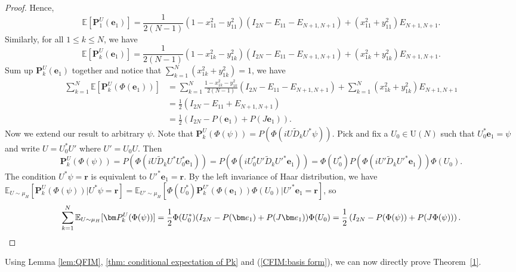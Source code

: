 \documentclass{amsart}
\theoremstyle{plain}
\theoremstyle{definition}
\theoremstyle{remark}
\newcommand{\thmref}[1]{Theorem~\ref{#1}}
\newcommand{\EE}{\mathbb{E}}
\begin{document}
\begin{proof}
    Hence, 
    \[\EE[\bm P_1^U(\bm e_1)]=\frac{1}{2(N-1)}(1-x_{11}^2-y_{11}^2)(I_{2N}-E_{11}-E_{N+1,N+1})+(x_{11}^2+y_{11}^2)E_{N+1,N+1}.\] 
    Similarly, for all $1\leq k\leq N$, we have 
    \[\EE[\bm P_k^U(\bm e_1)]=\frac{1}{2(N-1)}(1-x_{1k}^2-y_{1k}^2)(I_{2N}-E_{11}-E_{N+1,N+1})+(x_{1k}^2+y_{1k}^2)E_{N+1,N+1}.\]
    Sum up $\bm P_k^U(\bm e_1)$ together and notice that $\sum\limits_{k=1}^{N}(x_{1k}^2+y_{1k}^2)=1$, we have
    \begin{align*}
        \sum\limits_{k=1}^N\EE[\bm P_k^U(\Phi(\bm e_1))]&=\sum\limits_{k=1}^{N}\frac{1-x_{1k}^2-y_{1k}^2}{2(N-1)}(I_{2N}-E_{11}-E_{N+1,N+1})+\sum\limits_{k=1}^N(x_{1k}^2+y_{1k}^2)E_{N+1,N+1}\\
        &=\frac{1}{2}\left(I_{2N}-E_{11}+E_{N+1,N+1}\right)\\
        &=\frac{1}{2}\left(I_{2N}-P(\bm e_1)+P(J\bm e_1)\right).
    \end{align*}
    Now we extend our result to arbitrary $\psi$. Note that $\bm P_k^U(\Phi(\psi))=P(\Phi(iU\tilde D_k U^*\psi))$. Pick and fix a $U_0\in \mathrm U(N)$ such that $U_0^*\bm e_1=\psi$ and write $U=U_0^*U'$ where $U'=U_0U$. Then \[\bm P_k^U(\Phi(\psi))=P(\Phi(iU\tilde D_kU^*U_0^*\bm e_1))=P(\Phi(iU_0^*U'\tilde D_kU'^*\bm e_1))=\Phi(U_0^*)P(\Phi(iU'\tilde D_kU'^*\bm e_1))\Phi(U_0).\]
    The condition $U^*\psi=\bm r$ is equivalent to $U'^*\bm e_1=\bm r$. By the left invariance of Haar distribution, we have $\EE_{U\sim\mu_H}[\bm P_k^U(\Phi(\psi))|U^*\psi =\bm r]=\EE_{U'\sim\mu_H}[\Phi(U_0^*)\bm P_k^{U'}(\Phi(\bm e_1)) \Phi(U_0)|U'^*\bm e_1=\bm r]$, so 
    \[ \sum\limits_{k=1}^N\EE_{U\sim\mu_H}[\bm P_k^U(\Phi(\psi))]=\frac{1}{2}\Phi(U_0^*)(I_{2N}-P(\bm e_1)+P(J\bm e_1)) \Phi(U_0)=\frac{1}{2}\left(I_{2N}-P(\Phi(\psi))+P(J \Phi(\psi))\right).
    \qedhere \]
\end{proof}
Using Lemma \ref{lem:QFIM}, \ref{thm: conditional expectation of Pk} and (\ref{CFIM:basis form}), we can now directly prove \thmref{1}.
\end{document}
